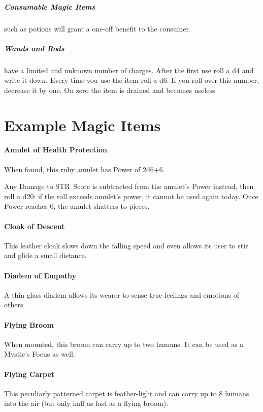 \documentclass[itdr]{subfiles}
\begin{document}
\subparagraph{Consumable Magic Items} such as potions will grant a one-off benefit to the consumer.

\subparagraph{Wands and Rods} have a limited and unknown number of charges. After the first use roll a d4 and write it down. Every time you use the item roll a d6. If you roll over this number, decrease it by one. On zero the item is drained and becomes useless.



\vfill
\break


\section{Example Magic Items}

\paragraph{Amulet of Health Protection}
When found, this ruby amulet has Power of 2d6+6.

Any Damage to STR~Score is subtracted from the amulet's Power instead, then roll a d20: if the roll exceeds amulet's power, it cannot be used again today. Once Power reaches 0, the amulet shatters to pieces.

\paragraph{Cloak of Descent}
This leather cloak slows down the falling speed and even allows its user to stir and glide a small distance.

\paragraph{Diadem of Empathy}
A thin glass diadem allows its wearer to sense true feelings and emotions of others.

\paragraph{Flying Broom}
When mounted, this broom can carry up to two \mbox{humans}. It can be used as a Mystic's Focus as well.

\paragraph{Flying Carpet}
This peculiarly patterned carpet is feather-light and can carry up to 8 humans into the air (but only half as fast as a flying broom).
\end{document}
